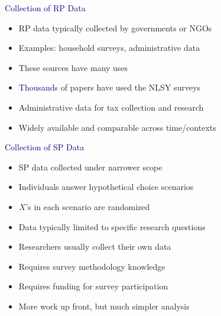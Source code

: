 \documentclass[aspectratio=169]{beamer}
\begin{document}
\begin{frame}

\textcolor{navy}{Collection of RP Data}

\bigskip

\begin{itemize}
\itemsep1.5em
\item<2-> RP data typically collected by governments or NGOs
\item<3-> Examples: household surveys, administrative data
\item<4-> These sources have many uses
\item<5-> \textcolor{navy}{Thousands} of papers have used the NLSY surveys
\item<6-> Administrative data for tax collection and research
\item<7-> Widely available and comparable across time/contexts
\end{itemize}

\end{frame}

\begin{frame}

\textcolor{navy}{Collection of SP Data}

\bigskip

\begin{itemize}
\itemsep1.25em
\item<2-> SP data collected under narrower scope
\item<3-> Individuals answer hypothetical choice scenarios
\item<4-> $X$'s in each scenario are randomized
\item<5-> Data typically limited to specific research questions
\item<6-> Researchers usually collect their own data
\item<7-> Requires survey methodology knowledge
\item<8-> Requires funding for survey participation
\item<9-> More work up front, but much simpler analysis
\end{itemize}

\end{frame}
\end{document}
